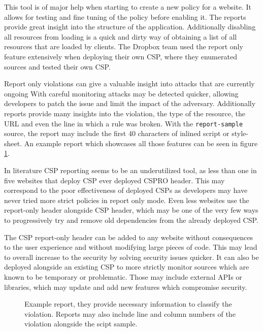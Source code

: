 This tool is of major help when starting to create a new policy for a website.
It allows for testing and fine tuning of the policy before enabling it. 
The reports provide great insight into the structure of the application.
Additionally disabling all resources from loading is a quick and dirty way of obtaining a list of all resources that are loaded by clients.
The Dropbox team used the report only feature extensively when deploying their own CSP, where they enumerated sources and tested their own CSP. \cite{dropboxcsp}


Report only violations can give a valuable insight into attacks that are currently ongoing 
With careful monitoring attacks may be detected quicker, allowing developers to patch the issue and limit the impact of the adversary.
Additionally reports provide many insights into the violation, the type of the resource, the URL and even the line in which a rule was broken.
With the \texttt{report-sample} source, the report may include the first 40 characters of inlined script or style-sheet. 
An example report which showcases all those features can be seen in figure \ref{exReport}.

In literature CSP reporting seems to be an underutilized tool, as less than one in five websites that deploy CSP ever deployed CSPRO header. \cite{osti_10173479}
This may correspond to the poor effectiveness of deployed CSPs as developers may have never tried more strict policies in report only mode.
Even less websites use the report-only header alongside CSP header, which may be one of the very few ways to progressively try and remove old dependencies from the already deployed CSP.

The CSP report-only header can be added to any website without consequences to the user experience and without modifying large pieces of code.
This may lead to overall increase to the security by solving security issues quicker.
It can also be deployed alongside an existing CSP to more strictly monitor sources which are known to be temporary or problematic.
Those may include external APIs or libraries, which may update and add new features which compromise security.

\begin{figure}[h]
	
	\caption{Example report, they provide necessary information to classify the violation. Reports may also include line and column numbers of the violation alongside the scipt sample.  }
	\label{exReport}
\end{figure}


